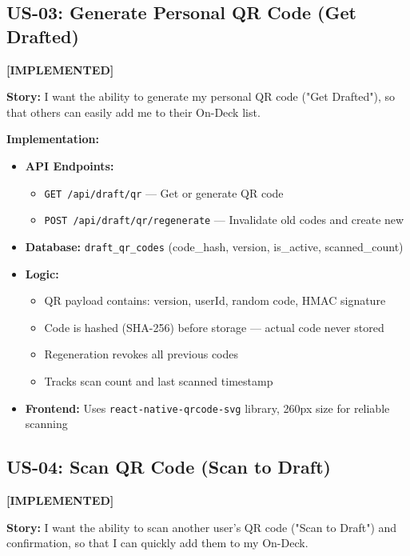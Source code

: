 \documentclass[11pt,a4paper]{article}
\newcommand{\implemented}{\textcolor{implemented}{\textbf{[IMPLEMENTED]}}}
\begin{document}
\subsection{US-03: Generate Personal QR Code (Get Drafted)}
\implemented

\textbf{Story:} I want the ability to generate my personal QR code ("Get Drafted"), so that others can easily add me to their On-Deck list.

\textbf{Implementation:}
\begin{itemize}[leftmargin=*]
  \item \textbf{API Endpoints:}
    \begin{itemize}
      \item \texttt{GET /api/draft/qr} --- Get or generate QR code
      \item \texttt{POST /api/draft/qr/regenerate} --- Invalidate old codes and create new
    \end{itemize}
  \item \textbf{Database:} \texttt{draft\_qr\_codes} (code\_hash, version, is\_active, scanned\_count)
  \item \textbf{Logic:}
    \begin{itemize}
      \item QR payload contains: version, userId, random code, HMAC signature
      \item Code is hashed (SHA-256) before storage --- actual code never stored
      \item Regeneration revokes all previous codes
      \item Tracks scan count and last scanned timestamp
    \end{itemize}
  \item \textbf{Frontend:} Uses \texttt{react-native-qrcode-svg} library, 260px size for reliable scanning
\end{itemize}

\subsection{US-04: Scan QR Code (Scan to Draft)}
\implemented

\textbf{Story:} I want the ability to scan another user's QR code ("Scan to Draft") and confirmation, so that I can quickly add them to my On-Deck.
\end{document}
